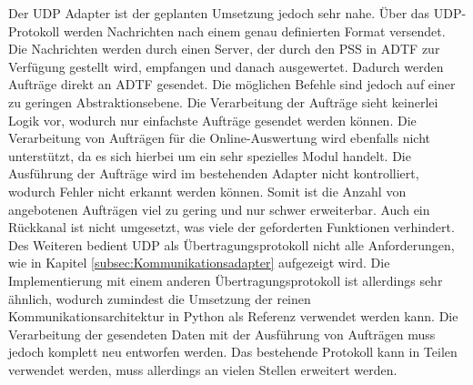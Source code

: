 \documentclass[12pt,a4paper]{report}
\begin{document}
Der UDP Adapter ist der geplanten Umsetzung jedoch sehr nahe. Über das UDP-Protokoll werden Nachrichten nach einem genau definierten Format versendet. Die Nachrichten werden durch einen Server, der durch den PSS in ADTF zur Verfügung gestellt wird, empfangen und danach ausgewertet. Dadurch werden Aufträge direkt an ADTF gesendet. Die möglichen Befehle sind jedoch auf einer zu geringen Abstraktionsebene. Die Verarbeitung der Aufträge sieht keinerlei Logik vor, wodurch nur einfachste Aufträge gesendet werden können. Die Verarbeitung von Aufträgen für die Online-Auswertung wird ebenfalls nicht unterstützt, da es sich hierbei um ein sehr spezielles Modul handelt. Die Ausführung der Aufträge wird im bestehenden Adapter nicht kontrolliert, wodurch Fehler nicht erkannt werden können. Somit ist die Anzahl von angebotenen Aufträgen viel zu gering und nur schwer erweiterbar. Auch ein Rückkanal ist nicht umgesetzt, was viele der geforderten Funktionen verhindert. Des Weiteren bedient UDP als Übertragungsprotokoll nicht alle Anforderungen, wie in Kapitel \ref{subsec:Kommunikationsadapter} aufgezeigt wird. Die Implementierung mit einem anderen Übertragungsprotokoll ist allerdings sehr ähnlich, wodurch zumindest die Umsetzung der reinen Kommunikationsarchitektur in Python als Referenz verwendet werden kann. Die Verarbeitung der gesendeten Daten mit der Ausführung von Aufträgen muss jedoch komplett neu entworfen werden. Das bestehende Protokoll kann in Teilen verwendet werden, muss allerdings an vielen Stellen erweitert werden.
\end{document}
